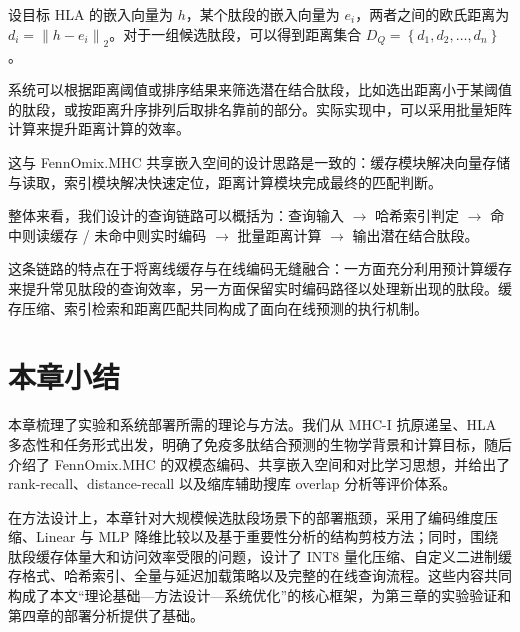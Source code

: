 设目标 HLA 的嵌入向量为 $h$，某个肽段的嵌入向量为 $e_i$，两者之间的欧氏距离为 $d_i = \left\| h - e_i \right\|_2$。对于一组候选肽段，可以得到距离集合 $D_Q = \left\{d_1, d_2, \ldots, d_n\right\}$。

系统可以根据距离阈值或排序结果来筛选潜在结合肽段，比如选出距离小于某阈值的肽段，或按距离升序排列后取排名靠前的部分。实际实现中，可以采用批量矩阵计算来提升距离计算的效率。

这与 FennOmix.MHC 共享嵌入空间的设计思路是一致的：缓存模块解决向量存储与读取，索引模块解决快速定位，距离计算模块完成最终的匹配判断。

整体来看，我们设计的查询链路可以概括为：查询输入 $\rightarrow$ 哈希索引判定 $\rightarrow$ 命中则读缓存 / 未命中则实时编码 $\rightarrow$ 批量距离计算 $\rightarrow$ 输出潜在结合肽段。

这条链路的特点在于将离线缓存与在线编码无缝融合：一方面充分利用预计算缓存来提升常见肽段的查询效率，另一方面保留实时编码路径以处理新出现的肽段。缓存压缩、索引检索和距离匹配共同构成了面向在线预测的执行机制。

\section{本章小结}

本章梳理了实验和系统部署所需的理论与方法。我们从 MHC-I 抗原递呈、HLA 多态性和任务形式出发，明确了免疫多肽结合预测的生物学背景和计算目标，随后介绍了 FennOmix.MHC 的双模态编码、共享嵌入空间和对比学习思想，并给出了 rank-recall、distance-recall 以及缩库辅助搜库 overlap 分析等评价体系。

在方法设计上，本章针对大规模候选肽段场景下的部署瓶颈，采用了编码维度压缩、Linear 与 MLP 降维比较以及基于重要性分析的结构剪枝方法；同时，围绕肽段缓存体量大和访问效率受限的问题，设计了 INT8 量化压缩、自定义二进制缓存格式、哈希索引、全量与延迟加载策略以及完整的在线查询流程。这些内容共同构成了本文“理论基础—方法设计—系统优化”的核心框架，为第三章的实验验证和第四章的部署分析提供了基础。
